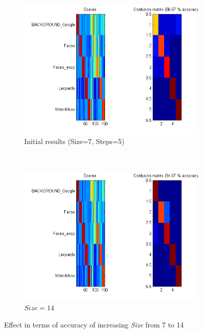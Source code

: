 \begin{figure}[htb]
	\centering
	\begin{subfigure}[t]{0.4\textwidth}
		\includegraphics[width=\textwidth]{./img/ex1/eval-initial.png}
		\caption{Initial results (Size=7, Steps=5)}
	\end{subfigure}
	~
	\begin{subfigure}[t]{0.4\textwidth}
		\includegraphics[width=\textwidth]{./img/ex1/eval-size-14.png}
		\caption{$ Size=14 $}
	\end{subfigure}
	
\caption{Effect in terms of accuracy of increasing \emph{Size} from 7 to 14}
\label{fig:effect-size-accuracy}
\end{figure}

